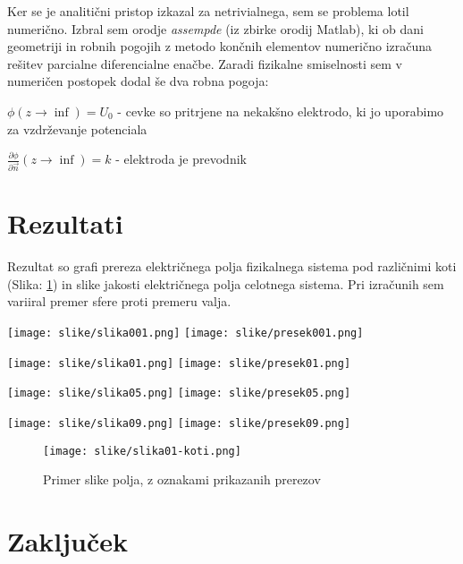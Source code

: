 \documentclass{article}[12pt]
\begin{document}
Ker se je analitični pristop izkazal za netrivialnega, sem se problema lotil numerično.
Izbral sem orodje \textit{assempde} (iz zbirke orodij Matlab), ki ob dani geometriji in robnih pogojih z metodo končnih elementov numerično izračuna rešitev parcialne diferencialne enačbe.
Zaradi fizikalne smiselnosti sem v numeričen postopek dodal še dva robna pogoja:

$ \phi (z \to \inf) = U_0 $ - cevke so pritrjene na nekakšno elektrodo, ki jo uporabimo za vzdrževanje potenciala

$ \frac{\partial \phi}{\partial \vec{n}} (z \to \inf) = k $ - elektroda je prevodnik

\section{Rezultati}

Rezultat so grafi prereza električnega polja fizikalnega sistema pod različnimi koti (Slika: \ref{slika01-koti}) in slike jakosti električnega polja celotnega sistema. Pri izračunih sem variiral premer sfere proti premeru valja.

\begin{center}
\texttt{[image: slike/slika001.png]}
\texttt{[image: slike/presek001.png]}
\end{center}

\begin{center}
\texttt{[image: slike/slika01.png]}
\texttt{[image: slike/presek01.png]}
\end{center}

\begin{center}
\texttt{[image: slike/slika05.png]}
\texttt{[image: slike/presek05.png]}
\end{center}

\begin{center}
\texttt{[image: slike/slika09.png]}
\texttt{[image: slike/presek09.png]}
\end{center}

\newpage
\begin{figure}
\begin{center}
\texttt{[image: slike/slika01-koti.png]}
\caption{Primer slike polja, z oznakami prikazanih prerezov}
\label{slika01-koti}
\end{center}
\end{figure}


\section{Zaključek}
\end{document}

